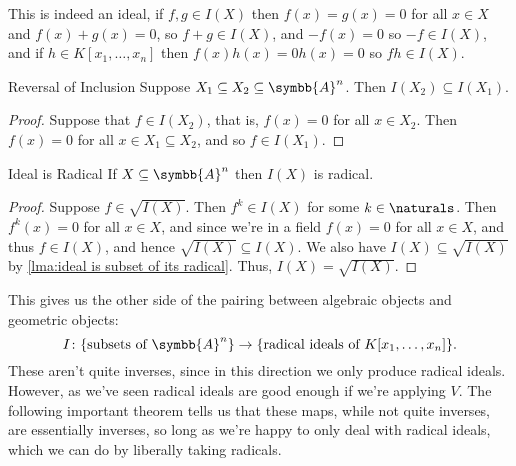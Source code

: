 \documentclass[fleqn]{NotesClass}
\newcommand{\affine}{\symbb{A}}
\begin{document}
    This is indeed an ideal, if \(f, g \in I(X)\) then \(f(x) = g(x) = 0\) for all \(x \in X\) and \(f(x) + g(x) = 0\), so \(f + g \in I(X)\), and \(-f(x) = 0\) so \(-f \in I(X)\), and if \(h \in K[x_1,\dotsc, x_n]\) then \(f(x)h(x) = 0h(x) = 0\) so \(fh \in I(X)\).
    
    \begin{lma}{Reversal of Inclusion}{}
        Suppose \(X_1 \subseteq X_2 \subseteq \affine^n\).
        Then \(I(X_2) \subseteq I(X_1)\).
        \begin{proof}
            Suppose that \(f \in I(X_2)\), that is, \(f(x) = 0\) for all \(x \in X_2\).
            Then \(f(x) = 0\) for all \(x \in X_1 \subseteq X_2\), and so \(f \in I(X_1)\).
        \end{proof}
    \end{lma}
    
    \begin{lma}{Ideal is Radical}{}
        If \(X \subseteq \affine^n\) then \(I(X)\) is radical.
        \begin{proof}
            Suppose \(f \in \sqrt{I(X)}\).
            Then \(f^k \in I(X)\) for some \(k \in \naturals\).
            Then \(f^k(x) = 0\) for all \(x \in X\), and since we're in a field \(f(x) = 0\) for all \(x \in X\), and thus \(f \in I(X)\), and hence \(\sqrt{I(X)} \subseteq I(X)\).
            We also have \(I(X) \subseteq \sqrt{I(X)}\) by \cref{lma:ideal is subset of its radical}.
            Thus, \(I(X) = \sqrt{I(X)}\).
        \end{proof}
    \end{lma}
    
    \begin{remark}{}{}
        This gives us the other side of the pairing between algebraic objects and geometric objects:
        \begin{equation}
            I \colon \{\text{subsets of } \affine^n\} \to \{\text{radical ideals of } K[x_1, \dotsc, x_n]\}.
        \end{equation}
        These aren't quite inverses, since in this direction we only produce radical ideals.
        However, as we've seen radical ideals are good enough if we're applying \(V\).
        The following important theorem tells us that these maps, while not quite inverses, are essentially inverses, so long as we're happy to only deal with radical ideals, which we can do by liberally taking radicals.
    \end{remark}
    
\end{document}
